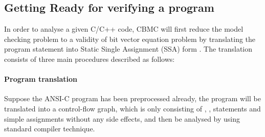 \subsection{Getting Ready for verifying a program}
In order to analyse a given C/C++ code, CBMC will first reduce the model checking problem to a validity of bit vector equation problem by translating the program statement into Static Single Assignment (SSA) form \cite{ckl2004, Clarke:2003:HVU:1119772.1119831}. The translation consists of three main procedures described as follows: 

\paragraph{Program translation} Suppose the ANSI-C program has been preprocessed already,  the program will be translated into a control-flow graph, which is only consisting of , ,  statements and simple assignments without any side effects, and then be analysed by using standard compiler technique.


